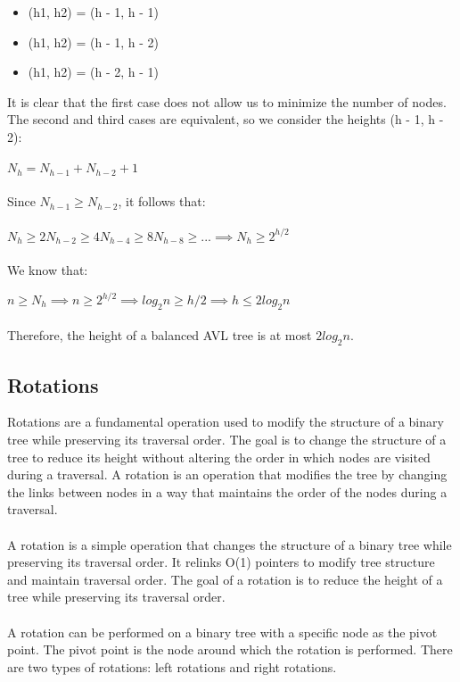 \documentclass[a4paper, 11pt, oneside]{book} %
\begin{document}
\begin{itemize}
    \item (h1, h2) = (h - 1, h - 1)
    \item (h1, h2) = (h - 1, h - 2)
    \item (h1, h2) = (h - 2, h - 1)
\end{itemize}


It is clear that the first case does not allow us to minimize the number of nodes. The second and third cases are equivalent, so we consider the heights (h - 1, h - 2):
\\
\\
$N_h = N_{h-1} + N_{h-2} + 1$
\\
\\
Since $N_{h-1} \ge N_{h-2}$, it follows that:
\\
\\
$N_h \ge 2N_{h-2} \ge 4N_{h-4} \ge 8N_{h-8} \ge ... \implies N_h \ge 2^{h/2}$
\\
\\
We know that:

$n \ge N_h \implies n \ge 2^{h/2} \implies log_2 n \ge h/2 \implies h \le 2log_2n$
\\
\\
Therefore, the height of a balanced AVL tree is at most $2log_2n$.


\subsection{Rotations}
Rotations are a fundamental operation used to modify the structure of a binary tree while preserving its traversal order. The goal is to change the structure of a tree to reduce its height without altering the order in which nodes are visited during a traversal. A rotation is an operation that modifies the tree by changing the links between nodes in a way that maintains the order of the nodes during a traversal.
\\
\\
A rotation is a simple operation that changes the structure of a binary tree while preserving its traversal order. It relinks O(1) pointers to modify tree structure and maintain traversal order. The goal of a rotation is to reduce the height of a tree while preserving its traversal order.
\\
\\
A rotation can be performed on a binary tree with a specific node as the pivot point. The pivot point is the node around which the rotation is performed. There are two types of rotations: left rotations and right rotations.
\end{document}

